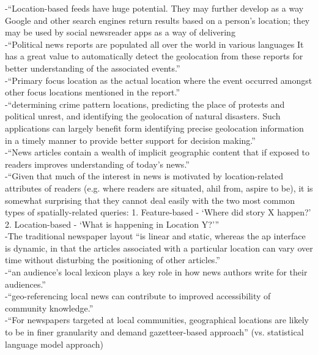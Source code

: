 -{\color{orange}“Location-based feeds have huge potential. They may further develop as a way Google and other search engines return results based on a person’s location; they may be used by social newsreader apps as a way of delivering \cite{Marshall2020}}\\
-{\color{orange}“Political news reports are populated all over the world in various languages It has a great value to automatically detect the geolocation from these reports for better understanding of the associated events.”\cite{Imani2019}}\\
-{\color{orange}“Primary focus location as the actual location where the event occurred amongst other focus locations mentioned in the report.”\cite{Imani2019}}\\
-{\color{orange}“determining crime pattern locations, predicting the place of protests and political unrest, and identifying the geolocation of natural disasters. Such applications can largely benefit form identifying precise geolocation information in a timely manner to provide better support for decision making.”\cite{Imani2019}}\\
-{\color{orange}“News articles contain a wealth of implicit geographic content that if exposed to readers improves understanding of today’s news.”\cite{Teitler2008}}\\
-{\color{orange}“Given that much of the interest in news is motivated by location-related attributes of readers (e.g. where readers are situated, ahil from, aspire to be), it is somewhat surprising that they cannot deal easily with the two most common types of spatially-related queries: 1. Feature-based - ‘Where did story X happen?’ 2. Location-based - ‘What is happening in Location Y?’”\cite{Teitler2008}}\\
-{\color{orange}The traditional newspaper layout “is linear and static, whereas the ap interface is dynamic, in that the articles associated with a particular location can vary over time without disturbing the positioning of other articles.”\cite{Teitler2008}}\\
-{\color{orange}“an audience’s local lexicon plays a key role in how news authors write for their audiences.” \cite{Lieberman2010}}\\
-{\color{orange}“geo-referencing local news can contribute to improved accessibility of community knowledge.”\cite{Cai2016}}\\
-{\color{orange}“For newspapers targeted at local communities, geographical locations are likely to be in finer granularity and demand gazetteer-based approach” (vs. statistical language model approach)\cite{Cai2016}}\\
